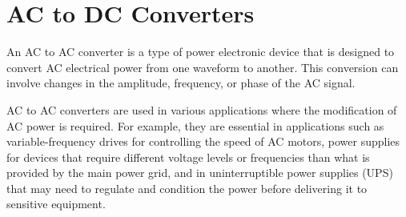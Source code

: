 \section{AC to DC Converters}
An AC to AC converter is a type of power electronic device that is designed to convert AC electrical power from one waveform to another. This conversion can involve changes in the amplitude, frequency, or phase of the AC signal.

AC to AC converters are used in various applications where the modification of AC power is required. For example, they are essential in applications such as variable-frequency drives for controlling the speed of AC motors, power supplies for devices that require different voltage levels or frequencies than what is provided by the main power grid, and in uninterruptible power supplies (UPS) that may need to regulate and condition the power before delivering it to sensitive equipment.
